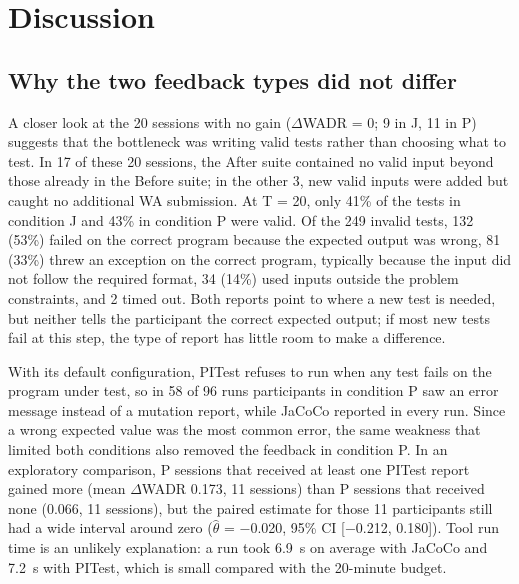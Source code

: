 \section{Discussion}
\label{sec:discussion}

\subsection{Why the two feedback types did not differ}
A closer look at the 20 sessions with no gain ($\Delta$WADR = 0; 9 in J, 11 in P) suggests that the bottleneck was writing valid tests rather than choosing what to test.
In 17 of these 20 sessions, the After suite contained no valid input beyond those already in the Before suite; in the other 3, new valid inputs were added but caught no additional WA submission.
At T = 20, only 41\% of the tests in condition J and 43\% in condition P were valid.
Of the 249 invalid tests, 132 (53\%) failed on the correct program because the expected output was wrong, 81 (33\%) threw an exception on the correct program, typically because the input did not follow the required format, 34 (14\%) used inputs outside the problem constraints, and 2 timed out.
Both reports point to where a new test is needed, but neither tells the participant the correct expected output; if most new tests fail at this step, the type of report has little room to make a difference.

With its default configuration, PITest refuses to run when any test fails on the program under test, so in 58 of 96 runs participants in condition P saw an error message instead of a mutation report, while JaCoCo reported in every run.
Since a wrong expected value was the most common error, the same weakness that limited both conditions also removed the feedback in condition P.
In an exploratory comparison, P sessions that received at least one PITest report gained more (mean $\Delta$WADR 0.173, 11 sessions) than P sessions that received none (0.066, 11 sessions), but the paired estimate for those 11 participants still had a wide interval around zero ($\hat{\theta}$ = $-$0.020, 95\% CI [$-$0.212, 0.180]).
Tool run time is an unlikely explanation: a run took 6.9~s on average with JaCoCo and 7.2~s with PITest, which is small compared with the 20-minute budget.

